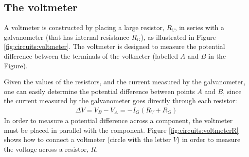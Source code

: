 \subsection{The voltmeter}
A voltmeter is constructed by placing a large resistor, $R_V$, in series with a galvanometer (that has internal resistance $R_G$), as illustrated in Figure \ref{fig:circuits:voltmeter}. The voltmeter is designed to measure the potential difference between the terminals of the voltmeter (labelled $A$ and $B$ in the Figure).


Given the values of the resistors, and the current measured by the galvanometer, one can easily determine the potential difference between points $A$ and $B$, since the current measured by the galvanometer goes directly through each resistor:
\begin{align*}
\Delta V = V_B-V_A=-I_G(R_V+R_G)
\end{align*}
In order to measure a potential difference across a component, the voltmeter must be placed in parallel with the component. Figure \ref{fig:circuits:voltmeterR} shows how to connect a voltmeter (circle with the letter $V$) in order to measure the voltage across a resistor, $R$.


